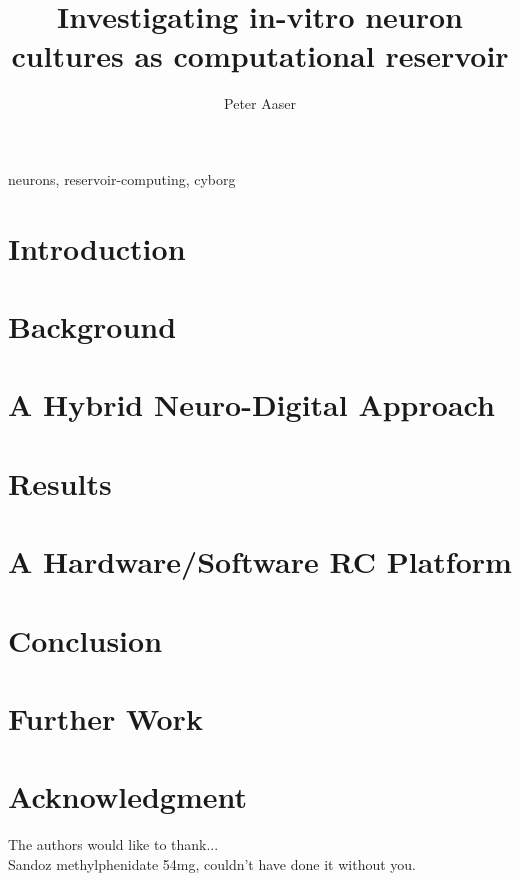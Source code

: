 \documentclass[journal]{IEEEtran}
\begin{document}
\title{Investigating in-vitro neuron cultures as computational reservoir}

\author{Peter Aaser}
%
\maketitle

\begin{abstract}
  \blindtext[2]

\end{abstract}

\begin{IEEEkeywords}
neurons, reservoir-computing, cyborg
\end{IEEEkeywords}

\section{Introduction}

\section{Background}

\section{A Hybrid Neuro-Digital Approach}

% 
\section{Results}

% 
\section{A Hardware/Software RC Platform}

\section{Conclusion}

\section{Further Work}



\section*{Acknowledgment}
The authors would like to thank...\\
Sandoz methylphenidate 54mg, couldn't have done it without you.


 

\end{document}
